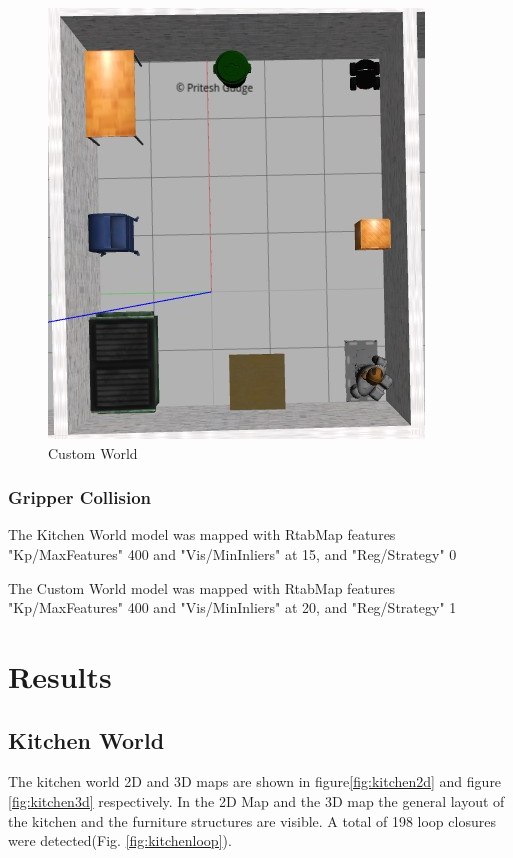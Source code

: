 \documentclass[10pt,journal,compsoc]{IEEEtran}
\begin{document}
\begin{figure}[thpb]
      \centering
      \includegraphics[width=\linewidth]{images/1_world_gz}
      \caption{Custom World}
      \label{fig:customworld}
\end{figure}

\subsubsection{Gripper Collision}
The Kitchen World model was mapped with RtabMap features "Kp/MaxFeatures" 400 and "Vis/MinInliers" at 15, and "Reg/Strategy" 0

The Custom World model was mapped with RtabMap features "Kp/MaxFeatures" 400 and "Vis/MinInliers" at 20, and "Reg/Strategy" 1



\section{Results}

\subsection{Kitchen World}
The kitchen world 2D and 3D maps are shown in figure\ref{fig:kitchen2d} and figure \ref{fig:kitchen3d} respectively. In the 2D Map and the 3D map the general layout of the kitchen and the furniture structures are visible. A total of 198 loop closures were detected(Fig. \ref{fig:kitchenloop}).
\end{document}
